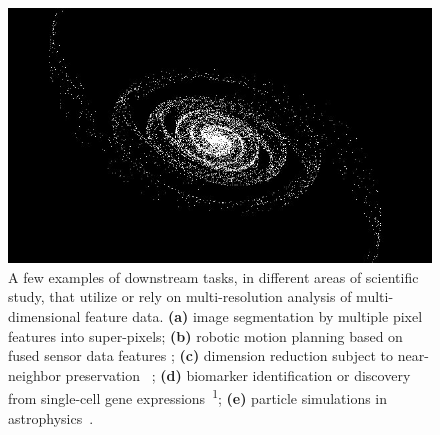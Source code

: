 \documentclass[final]{juliacon}
\begin{document}
\begin{figure}
\begin{minipage}{0.32\linewidth}
    \includegraphics[width=\linewidth]
    {images/scenarios/nbody.png}
  \end{minipage}
  \vspace*{0.5em}
  \caption{%
    A few examples of downstream tasks, in different
    areas of scientific study, that utilize or rely on
    multi-resolution analysis of multi-dimensional feature data.
    {\bf (a)} image segmentation by multiple pixel features into
    super-pixels\cite{floros2022a};
    {\bf (b)} robotic motion planning based on fused sensor data features
    \cite{seiwald2021}; 
    {\bf (c)} dimension reduction subject to near-neighbor preservation
    ~\cite{roweis2000,tenenbaum2000,hinton2002,vandermaaten2008,vandermaaten2014,pitsianis2019,mcinnes2020};
    {\bf (d)} biomarker identification or discovery from single-cell
    gene expressions~\cite{zheng2017}\textsuperscript{1};
    {\bf (e)} particle simulations in
    astrophysics~\cite{barnes1986,greengard1987,carrier1988}.}
  \label{fig:down-stream-tasks}    
\end{figure}

\end{document}
